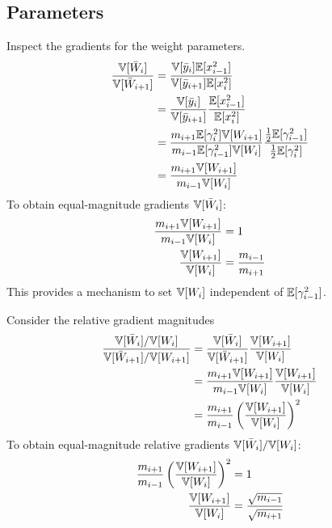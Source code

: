 \subsection{Parameters}

Inspect the gradients for the weight parameters.
\begin{align}
\frac{\mathbb{V}[\bar{W}_{i}]}{\mathbb{V}[\bar{W}_{i+1}]}
& = \frac{\mathbb{V}[\bar{y}_{i}] \mathbb{E}[x_{i-1}^2]}{\mathbb{V}[\bar{y}_{i+1}] \mathbb{E}[x_{i}^2]} \\
& = \frac{\mathbb{V}[\bar{y}_{i}]}{\mathbb{V}[\bar{y}_{i+1}]} \frac{\mathbb{E}[x_{i-1}^2]}{\mathbb{E}[x_{i}^2]} \\
& = \frac{ m_{i+1} \mathbb{E}[\gamma_{i}^2] \mathbb{V}[W_{i+1}] }{ m_{i-1} \mathbb{E}[\gamma_{i-1}^2] \mathbb{V}[W_{i}] }
  \frac{ \tfrac{1}{2} \mathbb{E}[\gamma_{i-1}^2] }{ \tfrac{1}{2} \mathbb{E}[\gamma_{i}^2] } \\
& = \frac{ m_{i+1} \mathbb{V}[W_{i+1}] }{ m_{i-1} \mathbb{V}[W_{i}] }
\end{align}
To obtain equal-magnitude gradients $\mathbb{V}[\bar{W}_{i}]$:
\begin{align}
 \frac{ m_{i+1} \mathbb{V}[W_{i+1}] }{ m_{i-1} \mathbb{V}[W_{i}] } & = 1 \\
 \frac{\mathbb{V}[W_{i+1}]}{\mathbb{V}[W_{i}]} & = \frac{m_{i-1}}{m_{i+1}}
\end{align}
This provides a mechanism to set $\mathbb{V}[W_{i}]$ independent of $\mathbb{E}[\gamma_{i-1}^2]$.

Consider the relative gradient magnitudes
\begin{align}
\frac{ \mathbb{V}[\bar{W}_{i}] / \mathbb{V}[W_{i}] }{ \mathbb{V}[\bar{W}_{i+1}] / \mathbb{V}[W_{i+1}] }
& = \frac{\mathbb{V}[\bar{W}_{i}]}{\mathbb{V}[\bar{W}_{i+1}]} \frac{\mathbb{V}[W_{i+1}]}{\mathbb{V}[W_{i}]} \\
& = \frac{ m_{i+1} \mathbb{V}[W_{i+1}] }{ m_{i-1} \mathbb{V}[W_{i}] } \frac{\mathbb{V}[W_{i+1}]}{\mathbb{V}[W_{i}]} \\
& = \frac{m_{i+1}}{m_{i-1}} \left(\frac{\mathbb{V}[W_{i+1}]}{\mathbb{V}[W_{i}]}\right)^2
\end{align}
To obtain equal-magnitude relative gradients $\mathbb{V}[\bar{W}_{i}] / \mathbb{V}[W_{i}]$:
\begin{align}
\frac{m_{i+1}}{m_{i-1}} \left(\frac{\mathbb{V}[W_{i+1}]}{\mathbb{V}[W_{i}]}\right)^2 & = 1 \\
\frac{\mathbb{V}[W_{i+1}]}{\mathbb{V}[W_{i}]} & = \frac{\sqrt{m_{i-1}}}{\sqrt{m_{i+1}}}
\end{align}

